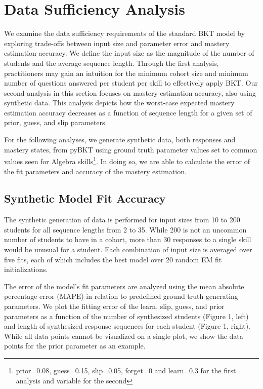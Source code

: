 \documentclass{edm_article}
\begin{document}
\section{Data Sufficiency Analysis}
We examine the data sufficiency requirements of the standard BKT model by exploring trade-offs between input size and parameter error and mastery estimation accuracy. We define the input size as the magnitude of the number of students and the average sequence length. Through the first analysis, practitioners may gain an intuition for the minimum cohort size and minimum number of questions answered per student per skill to effectively apply BKT. Our second analysis in this section focuses on mastery estimation accuracy, also using synthetic data. This analysis depicts how the worst-case expected mastery estimation accuracy decreases as a function of sequence length for a given set of prior, guess, and slip parameters. 


For the following analyses, we generate synthetic data, both responses and mastery states, from pyBKT using ground truth parameter values set to common values seen for Algebra skills\footnote{prior=0.08, guess=0.15, slip=0.05, forget=0 and learn=0.3 for the first analysis and variable for the second}. In doing so, we are able to calculate the error of the fit parameters and accuracy of the mastery estimation.  

\subsection{Synthetic Model Fit Accuracy}

The synthetic generation of data is performed for input sizes from 10 to 200 students for all sequence lengths from 2 to 35. While 200 is not an uncommon number of students to have in a cohort, more than 30 responses to a single skill would be unusual for a student. Each combination of input size is averaged over five fits, each of which includes the best model over 20 random EM fit initializations. 

The error of the model's fit parameters are analyzed using the mean absolute percentage error (MAPE) in relation to predefined ground truth generating parameters. We plot the fitting error of the learn, slip, guess, and prior parameters as a function of the number of synthesized students (Figure 1, left) and length of synthesized response sequences for each student (Figure 1, right). While all data points cannot be visualized on a single plot, we show the data points for the prior parameter as an example.
\end{document}
